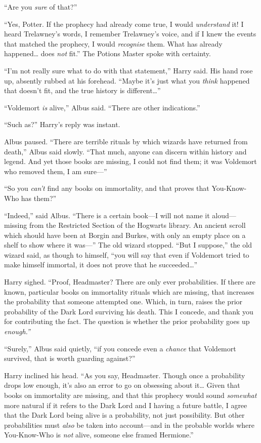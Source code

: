 ``Are you \emph{sure} of that?''

``Yes, Potter. If the prophecy had already come true, I would
\emph{understand} it! I heard Trelawney's words, I remember Trelawney's
voice, and if I knew the events that matched the prophecy, I would
\emph{recognise} them. What has already happened\ldots{} does \emph{not}
fit.'' The Potions Master spoke with certainty.

``I'm not really sure what to do with that statement,'' Harry said. His
hand rose up, absently rubbed at his forehead. ``Maybe it's just what
you \emph{think} happened that doesn't fit, and the true history is
different\ldots{}''

``Voldemort \emph{is} alive,'' Albus said. ``There are other
indications.''

``Such as?'' Harry's reply was instant.

Albus paused. ``There are terrible rituals by which wizards have
returned from death,'' Albus said slowly. ``That much, anyone can
discern within history and legend. And yet those books are missing, I
could not find them; it was Voldemort who removed them, I am sure---''

``So you \emph{can't} find any books on immortality, and that proves
that You-Know-Who has them?''

``Indeed,'' said Albus. ``There is a certain book---I will not name it
aloud---missing from the Restricted Section of the Hogwarts library. An
ancient scroll which should have been at Borgin and Burkes, with only an
empty place on a shelf to show where it was---'' The old wizard stopped.
``But I suppose,'' the old wizard said, as though to himself, ``you will
say that even if Voldemort tried to make himself immortal, it does not
prove that he succeeded\ldots{}''

Harry sighed. ``Proof, Headmaster? There are only ever probabilities. If
there are known, particular books on immortality rituals which are
missing, that increases the probability that someone attempted one.
Which, in turn, raises the prior probability of the Dark Lord surviving
his death. This I concede, and thank you for contributing the fact. The
question is whether the prior probability goes up \emph{enough.''}

``Surely,'' Albus said quietly, ``if you concede even a \emph{chance}
that Voldemort survived, that is worth guarding against?''

Harry inclined his head. ``As you say, Headmaster. Though once a
probability drops low enough, it's also an error to go on obsessing
about it\ldots{} Given that books on immortality are missing, and that
this prophecy would sound \emph{somewhat} more natural if it refers to
the Dark Lord and I having a future battle, I agree that the Dark Lord
being alive is a probability, not just possibility. But other
probabilities must \emph{also} be taken into account---and in the
probable worlds where You-Know-Who is \emph{not} alive, someone else
framed Hermione.''

